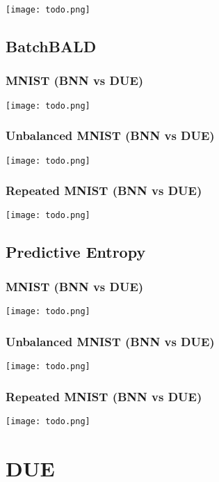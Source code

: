 \documentclass[12pt, a4paper]{report}
\theoremstyle{definition}
\begin{document}
\texttt{[image: todo.png]}

\subsection{BatchBALD}

\subsubsection{MNIST (BNN vs DUE)}

\texttt{[image: todo.png]}

\subsubsection{Unbalanced MNIST (BNN vs DUE)}

\texttt{[image: todo.png]}

\subsubsection{Repeated MNIST (BNN vs DUE)}

\texttt{[image: todo.png]}


\subsection{Predictive Entropy}

\subsubsection{MNIST (BNN vs DUE)}

\texttt{[image: todo.png]}

\subsubsection{Unbalanced MNIST (BNN vs DUE)}

\texttt{[image: todo.png]}

\subsubsection{Repeated MNIST (BNN vs DUE)}

\texttt{[image: todo.png]}

\section{DUE}
\end{document}
